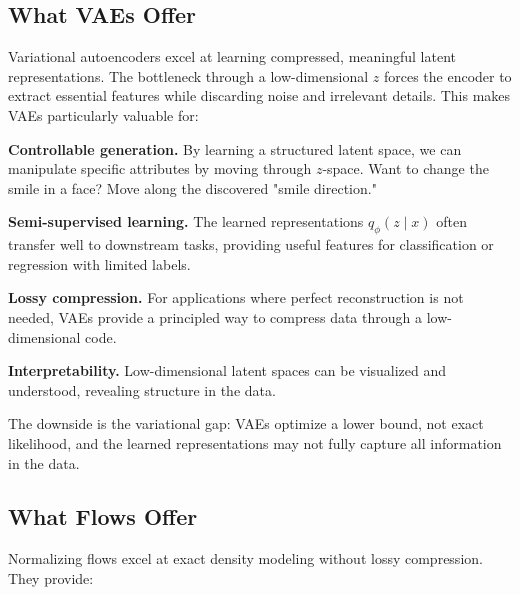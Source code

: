 \vspace{1em}

\subsection{What VAEs Offer}

Variational autoencoders excel at learning compressed, meaningful latent representations. The bottleneck through a low-dimensional $z$ forces the encoder to extract essential features while discarding noise and irrelevant details. This makes VAEs particularly valuable for:

\vspace{0.3cm}

\textbf{Controllable generation.} By learning a structured latent space, we can manipulate specific attributes by moving through $z$-space. Want to change the smile in a face? Move along the discovered "smile direction."

\vspace{0.3cm}

\textbf{Semi-supervised learning.} The learned representations $q_\phi(z \mid x)$ often transfer well to downstream tasks, providing useful features for classification or regression with limited labels.

\vspace{0.3cm}

\textbf{Lossy compression.} For applications where perfect reconstruction is not needed, VAEs provide a principled way to compress data through a low-dimensional code.

\vspace{0.3cm}

\textbf{Interpretability.} Low-dimensional latent spaces can be visualized and understood, revealing structure in the data.

\vspace{0.3cm}

The downside is the variational gap: VAEs optimize a lower bound, not exact likelihood, and the learned representations may not fully capture all information in the data.

\vspace{1.5em}

\subsection{What Flows Offer}

Normalizing flows excel at exact density modeling without lossy compression. They provide:

